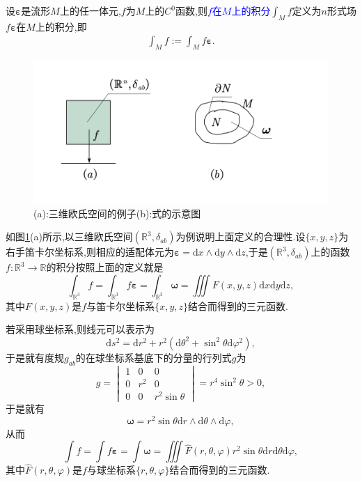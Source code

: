 设$\boldsymbol{\varepsilon}$是流形$M$上的任一体元,$f$为$M$上的$C^0$函数,则\textcolor{blue}{$f$在$M$上的积分}$\displaystyle \int_M f$定义为$n$形式场$f\boldsymbol{\varepsilon}$在$M$上的积分,即
\begin{align}
\int_Mf:=\int_M f\boldsymbol{\varepsilon}.
\end{align}
\begin{remark}
\begin{figure}[htbp]
    \centering
 \includegraphics[width=\textwidth]{img/5-5.png}
    \caption{(a):三维欧氏空间的例子(b):式的示意图}
    \label{fig:5-5}
\end{figure}

如图\ref{fig:5-5}(a)所示,以三维欧氏空间$(\mathbb{R}^3,\delta_{ab})$为例说明上面定义的合理性.设$\{x,y,z\}$为右手笛卡尔坐标系,则相应的适配体元为$\boldsymbol{\varepsilon}=\mathrm{d}x\wedge\mathrm{d}y\wedge\mathrm{d}z$,于是$(\mathbb{R}^3,\delta_{ab})$上的函数$f:\mathbb{R}^3\to\mathbb{R}$的积分按照上面的定义就是
$$
\int_{\mathbb{R}^3}f=\int_{\mathbb{R}^3}f\boldsymbol{\varepsilon}=\int_{\mathbb{R}^3}\boldsymbol{\omega}=\iiint F(x,y,z)\mathrm{d}x\mathrm{d}y\mathrm{d}z,
$$
其中$F(x,y,z)$是$f$与笛卡尔坐标系$\{x,y,z\}$结合而得到的三元函数.

若采用球坐标系,则线元可以表示为$$
\mathrm{d}s^2=\mathrm{d}r^2+r^2(\mathrm{d}\theta^2+\sin^2\theta\mathrm{d}\varphi^2),
$$
于是就有度规$g_{ab}$的在球坐标系基底下的分量的行列式$g$为
$$g=\begin{vmatrix}
    1 & 0&0 \\
    0 & r^2&0\\
    0 & 0&r^2\sin\theta
    \end{vmatrix}=r^4\sin^2\theta>0,$$
    于是就有$$
    \boldsymbol{\omega}=r^2\sin\theta \mathrm{d}r\wedge \mathrm{d}\theta\wedge\mathrm{d}\varphi,
    $$
   从而
   $$\int f=\int f\boldsymbol{\varepsilon}=\int\boldsymbol{\omega}=\iiint\hat{F}(r,\theta,\varphi)r^2\sin\theta\mathrm{d}r\mathrm{d}\theta\mathrm{d}\varphi,$$
   其中$\hat{F}(r,\theta,\varphi)$是$f$与球坐标系$\{r,\theta,\varphi\}$结合而得到的三元函数.
\end{remark}
